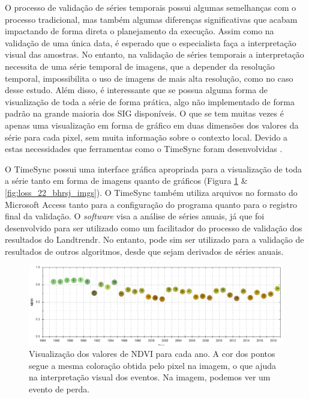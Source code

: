 O processo de validação de séries temporais possui algumas semelhanças com o processo tradicional, mas também algumas diferenças significativas que acabam impactando de forma direta o planejamento da execução. Assim como na validação de uma única data, é esperado que o especialista faça a interpretação visual das amostras. No entanto, na validação de séries temporais a interpretação necessita de uma série temporal de imagens, que a depender da resolução temporal, impossibilita o uso de imagens de mais alta resolução, como no caso desse estudo. Além disso, é interessante que se possua alguma forma de visualização de toda a série de forma prática, algo não implementado de forma padrão na grande maioria dos SIG disponíveis. O que se tem muitas vezes é apenas uma visualização em forma de gráfico em duas dimensões dos valores da série para cada pixel, sem muita informação sobre o contexto local. Devido a estas necessidades que ferramentas como o TimeSync foram desenvolvidas \citep{COHEN20102911}.

O TimeSync possui uma interface gráfica  apropriada para a visualização de toda a série tanto em forma de imagens quanto de gráficos (Figura \ref{fig:loss_22_bhrsj_graph} \& \ref{fig:loss_22_bhrsj_imgs}). O TimeSync também utiliza arquivos no formato do Microsoft Access tanto para a configuração do programa quanto para o registro final da validação. O \textit{software} visa a análise de séries anuais, já que foi desenvolvido para ser utilizado como um facilitador do processo de validação dos resultados do Landtrendr. No entanto, pode sim ser utilizado para a validação de resultados de outros algoritmos, desde que sejam derivados de séries anuais.

\begin{figure}[H]
    \centering
    \includegraphics[scale=.4]{images/loss_22_bhrsj_graph.pdf}
    \caption{Visualização dos valores de NDVI para cada ano. A cor dos pontos segue a mesma coloração obtida pelo pixel na imagem, o que ajuda na interpretação visual dos eventos. Na imagem, podemos ver um evento de perda.}
    \label{fig:loss_22_bhrsj_graph}
\end{figure}

